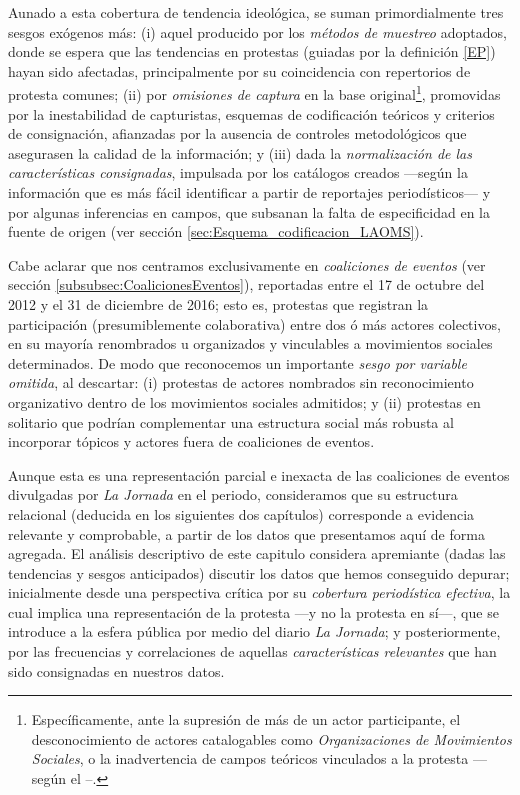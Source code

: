\documentclass[letterpaper, 11pt]{book}
\theoremstyle{definition}
\theoremstyle{remark}
\begin{document}
Aunado a esta cobertura de tendencia ideológica, se suman primordialmente tres sesgos exógenos más: 
(i) aquel producido por los \emph{métodos de muestreo} adoptados, donde se espera que las tendencias en protestas (guiadas por la definición \ref{EP}) hayan sido afectadas, principalmente por su coincidencia con repertorios de protesta comunes; 
(ii) por \emph{omisiones de captura} en la base original\footnote{
    Específicamente, ante la supresión de más de un actor participante, el desconocimiento de actores catalogables como \emph{Organizaciones de Movimientos Sociales}, o la inadvertencia de campos teóricos vinculados a la protesta ---según el --.
}, 
promovidas por la inestabilidad de capturistas, esquemas de codificación teóricos y criterios de consignación, afianzadas por la ausencia de controles metodológicos que asegurasen la calidad de la información; 
y (iii) dada la \emph{normalización de las características consignadas}, impulsada por los catálogos creados ---según la información que es más fácil identificar a partir de reportajes periodísticos--- y por algunas inferencias en campos, que subsanan la falta de especificidad en la fuente de origen (ver sección \ref{sec:Esquema_codificacion_LAOMS}). 


Cabe aclarar que nos centramos exclusivamente en \emph{coaliciones de eventos} (ver sección \ref{subsubsec:CoalicionesEventos}), reportadas entre el 17 de octubre del 2012 y el 31 de diciembre de 2016; esto es, protestas que registran la participación (presumiblemente colaborativa) entre dos ó más actores colectivos, en su mayoría renombrados u organizados y vinculables a movimientos sociales determinados. 
De modo que reconocemos un importante \emph{sesgo por variable omitida}, al descartar: 
(i) protestas de actores nombrados sin reconocimiento organizativo dentro de los movimientos sociales admitidos; y 
(ii) protestas en solitario que podrían complementar una estructura social más robusta al incorporar tópicos y actores fuera de coaliciones de eventos. 


Aunque esta es una representación parcial e inexacta de las coaliciones de eventos divulgadas por \emph{La Jornada} en el periodo, consideramos que su estructura relacional (deducida en los siguientes dos capítulos) corresponde a evidencia relevante y comprobable, a partir de los datos que presentamos aquí de forma agregada. 
El análisis descriptivo de este capitulo considera apremiante (dadas las tendencias y sesgos anticipados) discutir los datos que hemos conseguido depurar; inicialmente desde una perspectiva crítica por su \emph{cobertura periodística efectiva}, la cual implica una representación de la protesta ---y no la protesta en sí---, que se introduce a la esfera pública por medio del diario \emph{La Jornada}; y posteriormente, por las frecuencias y correlaciones de aquellas \emph{características relevantes} que han sido consignadas en nuestros datos. 
\end{document}
